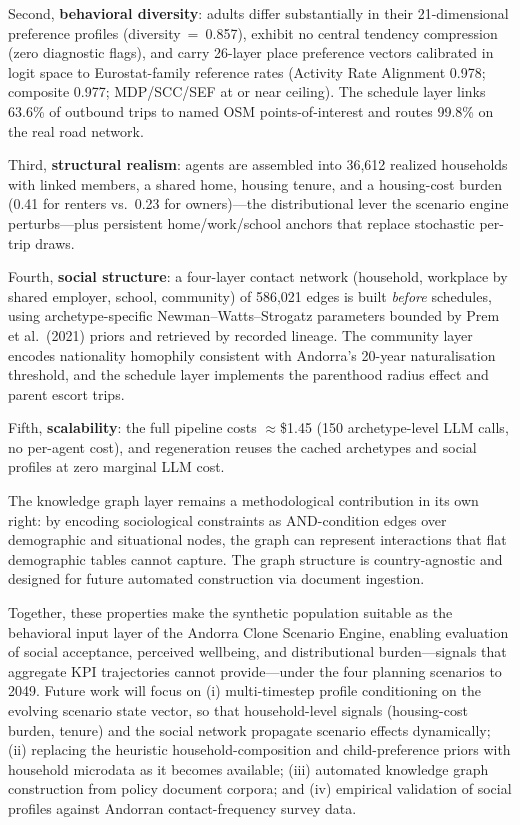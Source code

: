 \documentclass[a4paper,12pt]{article}
\begin{document}
Second, \textbf{behavioral diversity}: adults differ substantially in their
21-dimensional preference profiles (diversity~=~0.857), exhibit no central tendency
compression (zero diagnostic flags), and carry 26-layer place preference vectors
calibrated in logit space to Eurostat-family reference rates (Activity Rate Alignment
0.978; composite 0.977; MDP/SCC/SEF at or near ceiling). The schedule layer links
63.6\% of outbound trips to named OSM points-of-interest and routes 99.8\% on the
real road network.

Third, \textbf{structural realism}: agents are assembled into 36{,}612 realized
households with linked members, a shared home, housing tenure, and a housing-cost
burden (0.41 for renters vs.\ 0.23 for owners)---the distributional lever the scenario
engine perturbs---plus persistent home/work/school anchors that replace stochastic
per-trip draws.

Fourth, \textbf{social structure}: a four-layer contact network (household, workplace
by shared employer, school, community) of 586{,}021 edges is built \emph{before}
schedules, using archetype-specific Newman--Watts--Strogatz parameters bounded by
Prem et al.\ (2021) priors and retrieved by recorded lineage. The community layer
encodes nationality homophily consistent with Andorra's 20-year naturalisation
threshold, and the schedule layer implements the parenthood radius effect and parent
escort trips.

Fifth, \textbf{scalability}: the full pipeline costs $\approx$\$1.45 (150
archetype-level LLM calls, no per-agent cost), and regeneration reuses the cached
archetypes and social profiles at zero marginal LLM cost.

The knowledge graph layer remains a methodological contribution in its own
right: by encoding sociological constraints as AND-condition edges over
demographic and situational nodes, the graph can represent interactions that
flat demographic tables cannot capture. The graph structure is country-agnostic
and designed for future automated construction via document ingestion.

Together, these properties make the synthetic population suitable as the
behavioral input layer of the Andorra Clone Scenario Engine, enabling
evaluation of social acceptance, perceived wellbeing, and distributional
burden---signals that aggregate KPI trajectories cannot provide---under
the four planning scenarios to 2049. Future work will focus on
(i) multi-timestep profile conditioning on the evolving scenario state vector,
so that household-level signals (housing-cost burden, tenure) and the social
network propagate scenario effects dynamically; (ii) replacing the heuristic
household-composition and child-preference priors with household microdata as it
becomes available; (iii) automated knowledge graph construction from policy
document corpora; and (iv) empirical validation of social profiles against
Andorran contact-frequency survey data.
\end{document}
